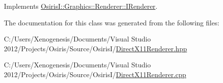 Implements \hyperlink{class_osiris_i_1_1_graphics_1_1_renderer_1_1_i_renderer_aa423ead00f38c631da7cb9dd847ab344}{Osiris\-I\-::\-Graphics\-::\-Renderer\-::\-I\-Renderer}.



The documentation for this class was generated from the following files\-:\begin{DoxyCompactItemize}
\item 
C\-:/\-Users/\-Xenogenesis/\-Documents/\-Visual Studio 2012/\-Projects/\-Osiris/\-Source/\-Osiris\-I/\hyperlink{_direct_x11_renderer_8hpp}{Direct\-X11\-Renderer.\-hpp}\item 
C\-:/\-Users/\-Xenogenesis/\-Documents/\-Visual Studio 2012/\-Projects/\-Osiris/\-Source/\-Osiris\-I/\hyperlink{_direct_x11_renderer_8cpp}{Direct\-X11\-Renderer.\-cpp}\end{DoxyCompactItemize}
